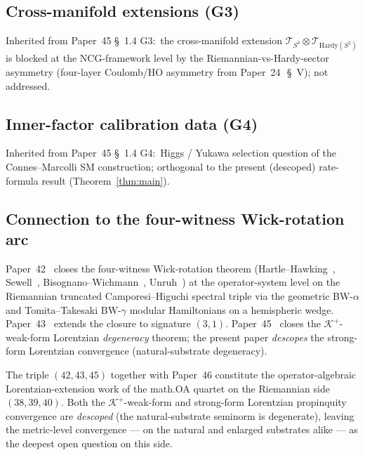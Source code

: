 \documentclass[11pt,a4paper]{article}
\theoremstyle{plain}
\theoremstyle{definition}
\newcommand{\sthree}{S^{3}}
\newcommand{\Krein}{\mathcal{K}}
\newcommand{\Tcal}{\mathcal{T}}
\newcommand{\Kplus}{\Krein^{+}}
\begin{document}
\subsection{Cross-manifold extensions (G3)}\label{sec:cross_manifold}

Inherited from Paper~45 \S~1.4 G3:\ the cross-manifold extension
$\Tcal_{\sthree} \otimes \Tcal_{\mathrm{Hardy}(S^{5})}$ is blocked at
the NCG-framework level by the Riemannian-vs-Hardy-sector asymmetry
(four-layer Coulomb/HO asymmetry from
Paper~24~\cite{paper24}\,\S~V); not addressed.

\subsection{Inner-factor calibration data (G4)}\label{sec:inner_factor}

Inherited from Paper~45 \S~1.4 G4:\ Higgs / Yukawa selection
question of the Connes--Marcolli SM construction; orthogonal to the
present (descoped) rate-formula result (Theorem~\ref{thm:main}).

\subsection{Connection to the four-witness Wick-rotation arc}
\label{sec:four_witness_op}

Paper~42~\cite{paper42} closes the four-witness Wick-rotation theorem
(Hartle--Hawking~\cite{hartle_hawking1976},
Sewell~\cite{sewell1982},
Bisognano--Wichmann~\cite{bisognano_wichmann1976},
Unruh~\cite{unruh1976}) at the operator-system level on the
Riemannian truncated Camporesi--Higuchi spectral triple via the
geometric BW-$\alpha$ and Tomita--Takesaki BW-$\gamma$ modular
Hamiltonians on a hemispheric wedge. Paper~43~\cite{paper43} extends
the closure to signature $(3, 1)$. Paper~45~\cite{paper45} closes the
$\Kplus$-weak-form Lorentzian \emph{degeneracy} theorem; the present
paper \emph{descopes} the strong-form Lorentzian convergence
(natural-substrate degeneracy).

The triple $(42, 43, 45)$ together with Paper~46 constitute the
operator-algebraic Lorentzian-extension work of the math.OA quartet
on the Riemannian side $(38, 39, 40)$. Both the $\Kplus$-weak-form and
strong-form Lorentzian propinquity convergence are \emph{descoped}
(the natural-substrate seminorm is degenerate), leaving
the metric-level convergence --- on the natural and enlarged
substrates alike --- as the deepest open question on this side.
\end{document}
